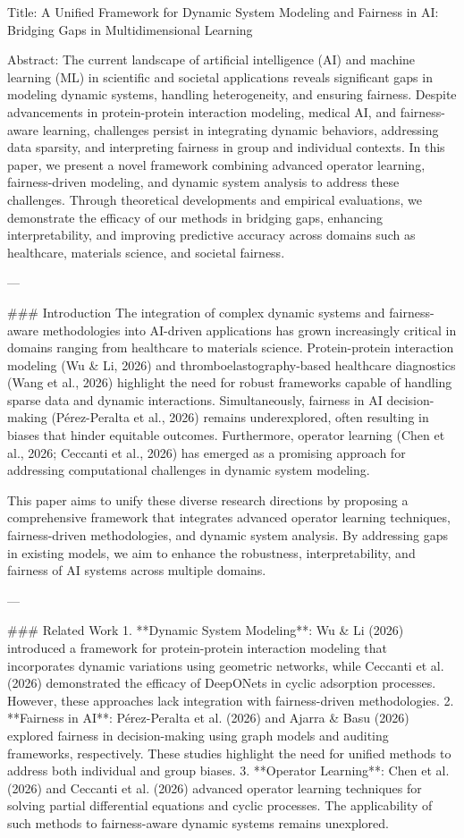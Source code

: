 Title: A Unified Framework for Dynamic System Modeling and Fairness in AI: Bridging Gaps in Multidimensional Learning

Abstract: The current landscape of artificial intelligence (AI) and machine learning (ML) in scientific and societal applications reveals significant gaps in modeling dynamic systems, handling heterogeneity, and ensuring fairness. Despite advancements in protein-protein interaction modeling, medical AI, and fairness-aware learning, challenges persist in integrating dynamic behaviors, addressing data sparsity, and interpreting fairness in group and individual contexts. In this paper, we present a novel framework combining advanced operator learning, fairness-driven modeling, and dynamic system analysis to address these challenges. Through theoretical developments and empirical evaluations, we demonstrate the efficacy of our methods in bridging gaps, enhancing interpretability, and improving predictive accuracy across domains such as healthcare, materials science, and societal fairness.

---

### Introduction
The integration of complex dynamic systems and fairness-aware methodologies into AI-driven applications has grown increasingly critical in domains ranging from healthcare to materials science. Protein-protein interaction modeling (Wu & Li, 2026) and thromboelastography-based healthcare diagnostics (Wang et al., 2026) highlight the need for robust frameworks capable of handling sparse data and dynamic interactions. Simultaneously, fairness in AI decision-making (Pérez-Peralta et al., 2026) remains underexplored, often resulting in biases that hinder equitable outcomes. Furthermore, operator learning (Chen et al., 2026; Ceccanti et al., 2026) has emerged as a promising approach for addressing computational challenges in dynamic system modeling.

This paper aims to unify these diverse research directions by proposing a comprehensive framework that integrates advanced operator learning techniques, fairness-driven methodologies, and dynamic system analysis. By addressing gaps in existing models, we aim to enhance the robustness, interpretability, and fairness of AI systems across multiple domains.

---

### Related Work
1. **Dynamic System Modeling**: Wu & Li (2026) introduced a framework for protein-protein interaction modeling that incorporates dynamic variations using geometric networks, while Ceccanti et al. (2026) demonstrated the efficacy of DeepONets in cyclic adsorption processes. However, these approaches lack integration with fairness-driven methodologies.
2. **Fairness in AI**: Pérez-Peralta et al. (2026) and Ajarra & Basu (2026) explored fairness in decision-making using graph models and auditing frameworks, respectively. These studies highlight the need for unified methods to address both individual and group biases.
3. **Operator Learning**: Chen et al. (2026) and Ceccanti et al. (2026) advanced operator learning techniques for solving partial differential equations and cyclic processes. The applicability of such methods to fairness-aware dynamic systems remains unexplored.

